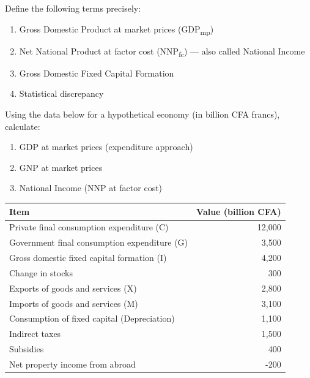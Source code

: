 \documentclass[11pt]{article}
\newcounter{popsec}
\newcounter{popsub}
\newcommand{\courssub}[1]{%
  \stepcounter{popsub}%
  \par\vspace{9pt}\noindent{\popxbold\fontsize{11.5}{13}\selectfont\color{popink}{\color{poporange}\thepopsec.\thepopsub}\hspace{6pt}#1}\par\nopagebreak\vspace{4pt}
}
\begin{document}
\begin{exercice}[Definitions]
Define the following terms precisely:
\begin{enumerate}
\item Gross Domestic Product at market prices (GDP\textsubscript{mp})
\item Net National Product at factor cost (NNP\textsubscript{fc}) — also called National Income
\item Gross Domestic Fixed Capital Formation
\item Statistical discrepancy
\end{enumerate}
\end{exercice}

\begin{exercice}
Using the data below for a hypothetical economy (in billion CFA francs), calculate:
\begin{enumerate}
\item GDP at market prices (expenditure approach)
\item GNP at market prices
\item National Income (NNP at factor cost)
\end{enumerate}
\begin{center}
\begin{tabular}{|l|r|}
\hline
\textbf{Item} & \textbf{Value (billion CFA)} \\
\hline
Private final consumption expenditure (C) & 12,000 \\
Government final consumption expenditure (G) & 3,500 \\
Gross domestic fixed capital formation (I) & 4,200 \\
Change in stocks & 300 \\
Exports of goods and services (X) & 2,800 \\
Imports of goods and services (M) & 3,100 \\
Consumption of fixed capital (Depreciation) & 1,100 \\
Indirect taxes & 1,500 \\
Subsidies & 400 \\
Net property income from abroad & -200 \\
\hline
\end{tabular}
\end{center}
\end{exercice}

\courssub{I practise}
\end{document}
